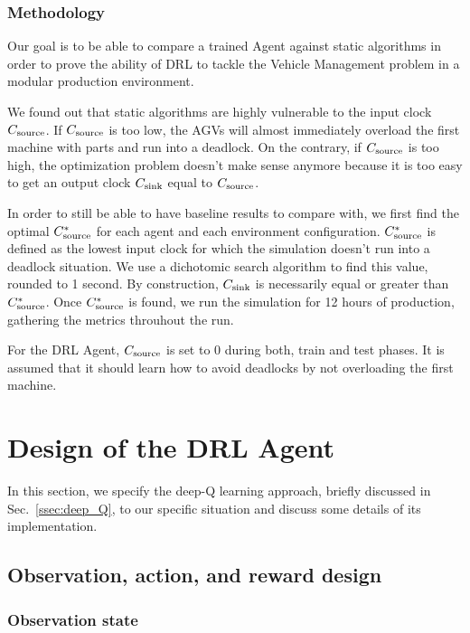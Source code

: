 \documentclass[sn-mathphys]{sn-jnl}
\begin{document}
\subsubsection{Methodology}

Our goal is to be able to compare a trained Agent against static algorithms in order to prove the ability of DRL to tackle the Vehicle Management problem in a modular production environment.

We found out that static algorithms are highly vulnerable to the input clock $C_{\rm source}$. If $C_{\rm source}$ is too low, the AGVs will almost immediately overload the first machine with parts and run into a deadlock. On the contrary, if $C_{\rm source}$ is too high, the optimization problem doesn’t make sense anymore because it is too easy to get an output clock $C_{\rm sink}$ equal to $C_{\rm source}$. 

In order to still be able to have baseline results to compare with, we first find the optimal $C_{\rm source}^*$ for each agent and each environment configuration. $C_{\rm source}^*$ is defined as the lowest input clock for which the simulation doesn’t run into a deadlock situation. We use a dichotomic search algorithm to find this value, rounded to 1 second. By construction, $C_{\rm sink}$ is necessarily equal or greater than $C_{\rm source}^*$. Once $C_{\rm source}^*$ is found, we run the simulation for 12 hours of production, gathering the metrics throuhout the run.

For the DRL Agent, $C_{\rm source}$ is set to $0$ during both, train and test phases. It is assumed that it should learn how to avoid deadlocks by not overloading the first machine.

\section{Design of the DRL Agent}
\label{sec:design_DRLagent}

In this section, we specify the deep-Q learning approach, briefly discussed in Sec.~\ref{ssec:deep_Q}, to our specific situation and discuss some details of its implementation.


\subsection{Observation, action, and reward design}
\label{ssec:observation_action_reward}

\subsubsection{Observation state}
\end{document}
